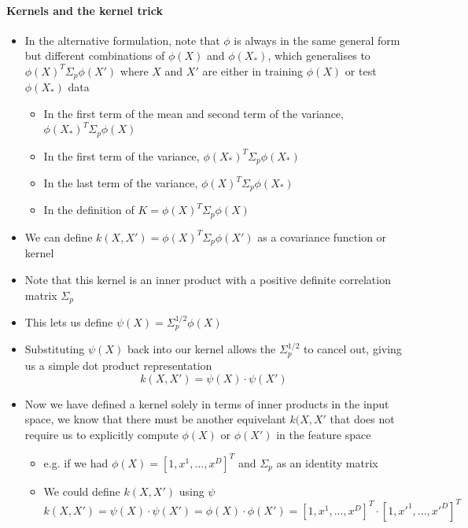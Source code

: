 \documentclass[12pt]{article}
\begin{document}
\paragraph{Kernels and the kernel trick}
\begin{itemize}
    \item In the alternative formulation, note that $\phi$ is always in the same general form but different combinations of $\phi(X)$ and $\phi(X_*)$, which generalises to $\phi(X)^T\Sigma_p\phi(X')$ where $X$ and $X'$ are either in training $\phi(X)$ or test $\phi(X_*)$ data
    \begin{itemize}
        \item In the first term of the mean and second term of the variance, $\phi(X_*)^T\Sigma_p\phi(X)$
        \item In the first term of the variance, $\phi(X_*)^T\Sigma_p\phi(X_*)$
        \item In the last term of the variance, $\phi(X)^T\Sigma_p\phi(X_*)$
        \item In the definition of $K = \phi(X)^T\Sigma_p\phi(X)$
    \end{itemize}
    \item We can define $k(X,X') = \phi(X)^T\Sigma_p\phi(X')$ as a covariance function or kernel
    \item Note that this kernel is an inner product with a positive definite correlation matrix $\Sigma_p$
    \item This lets us define $\psi(X) = \Sigma_p^{1/2}\phi(X)$
    \item Substituting $\psi(X)$ back into our kernel allows the $\Sigma_p^{1/2}$ to cancel out, giving us a simple dot product representation  
\begin{equation}
    k(X,X') = \psi(X) \cdot \psi(X')
\end{equation}
    \item Now we have defined a kernel solely in terms of inner products in the input space, we know that there must be another equivelant $k(X, X'$ that does not require us to explicitly compute $\phi(X)$ or $\phi(X')$ in the feature space
    \begin{itemize}
        \item e.g. if we had $\phi(X) = [1, x^1, ..., x^D]^T$ and $\Sigma_p$ as an identity matrix
        \item We could define $k(X,X')$ using $\psi$
\begin{equation}
    k(X,X') = \psi(X) \cdot \psi(X') = \phi(X) \cdot \phi(X') = [1, x^1, ..., x^D]^T \cdot [1, x'^1, ..., x'^D]^T

\end{equation}
\end{itemize}
\end{itemize}
\end{document}
